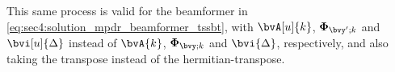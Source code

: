This same process is valid for the beamformer in \cref{eq:sec4:solution_mpdr_beamformer_tssbt}, with $\bvA[u]{k}$, $\Corr{\bvy';k}$ and $\bvi[u]{\Delta}$ instead of $\bvA{k}$, $\Corr{\bvy;k}$ and $\bvi{\Delta}$, respectively, and also taking the transpose instead of the hermitian-transpose.
%
%

